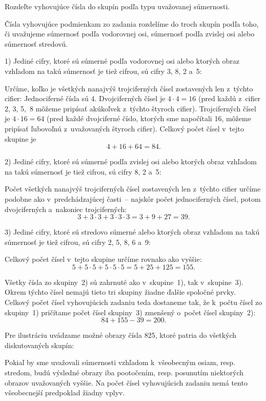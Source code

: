 {%
\napad
Rozdeľte vyhovujúce čísla do skupín podľa typu uvažovanej súmernosti.

\riesenie
Čísla vyhovujúce podmienkam zo zadania rozdelíme do troch skupín podľa
toho, či uvažujeme súmernosť podľa vodorovnej osi, súmernosť podľa zvislej
osi alebo súmernosť stredovú.

1)
Jediné cifry, ktoré sú súmerné podľa vodorovnej osi alebo ktorých
obraz vzhľadom na takú súmernosť je tiež cifrou, sú cifry 3, 8, 2
a~5:
%

Určíme, koľko je všetkých nanajvýš trojciferných čísel zostavených len z~týchto cifier:
Jednociferné čísla sú 4.
Dvojciferných čísel je $4\cdot4=16$ (pred každú z~cifier 2, 3, 5,~8
môžeme pripísať akúkoľvek z~týchto štyroch cifier).
Trojciferných čísel je $4\cdot16=64$ (pred každé dvojciferné číslo,
ktorých sme napočítali 16, môžeme pripísať ľubovoľnú z~uvažovaných štyroch
cifier).
Celkový počet čísel v~tejto skupine je
$$
4+16+64=84.
$$

2)
Jediné cifry, ktoré sú súmerné podľa zvislej osi alebo ktorých
obraz vzhľadom na takú súmernosť je tiež cifrou, sú cifry 8, 2
a~5:
%

Počet všetkých nanajvýš trojciferných čísel zostavených len z~týchto cifier
určíme podobne ako v~predchádzajúcej časti~--
najskôr počet jednociferných čísel, potom dvojciferných a~nakoniec
trojciferných:
$$
3+3\cdot3+3\cdot3\cdot3=3+9+27=39.
$$


3)
Jediné cifry, ktoré sú stredovo súmerné alebo ktorých
obraz vzhľadom na takú súmernosť je tiež cifrou, sú cifry 2, 5, 8,
6 a~9:
%

Celkový počet čísel v~tejto skupine určíme rovnako ako vyššie:
$$
5+5\cdot5+5\cdot5\cdot5=5+25+125=155.
$$

Všetky čísla zo skupiny~2) sú zahrnuté ako v~skupine~1), tak v~skupine~3).
Okrem týchto čísel nemajú tieto tri skupiny žiadne ďalšie spoločné prvky.
Celkový počet čísel vyhovujúcich zadaniu teda dostaneme tak, že k~počtu čísel zo skupiny~1) pričítame počet čísel skupiny~3) zmenšený o~počet
čísel skupiny~2):
$$
84+155-39=200.
$$

\poznamky
Pre ilustráciu uvádzame možné obrazy čísla 825, ktoré patria do všetkých
diskutovaných skupín:
%

Pokiaľ by sme uvažovali súmernosti vzhľadom k~všeobecným osiam, resp. stredom,
budú výsledné obrazy iba pootočením, resp. posunutím niektorých obrazov
uvažovaných vyššie.
Na počet čísel vyhovujúcich zadaniu nemá tento všeobecnejší predpoklad
žiadny vplyv.
%
}

